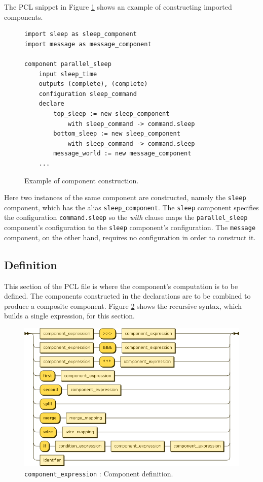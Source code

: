 The PCL snippet in Figure \ref{fig:pcl-decl-example} shows an example of constructing imported components.
\begin{figure}[h!]
\begin{center}
\begin{verbatim}
import sleep as sleep_component
import message as message_component

component parallel_sleep
    input sleep_time
    outputs (complete), (complete)
    configuration sleep_command
    declare
        top_sleep := new sleep_component
            with sleep_command -> command.sleep
        bottom_sleep := new sleep_component
            with sleep_command -> command.sleep
        message_world := new message_component
    ...
\end{verbatim}
\end{center}
\caption{Example of component construction.}
\label{fig:pcl-decl-example}
\end{figure}
Here two instances of the same component are constructed, namely the \texttt{sleep} component, which has the alias \texttt{sleep\_component}. The \texttt{sleep} component specifies the configuration \texttt{command.sleep} so the \emph{with} clause maps the \texttt{parallel\_sleep} component's configuration to the \texttt{sleep} component's configuration. The \texttt{message} component, on the other hand, requires no configuration in order to construct it.

\subsection{Definition}
This section of the PCL file is where the component's computation is to be defined. The components constructed in the declarations are to be combined to produce a composite component. Figure \ref{fig:pcl-def} shows the recursive syntax, which builds a single expression, for this section.
\begin{figure}[h!]
  \centering
    \includegraphics[scale=\DiagramScale,angle=90]{chapters/compiler/diagrams/component_expression}
  \caption{\texttt{component\_expression} : Component definition.}
  \label{fig:pcl-def}
\end{figure}

